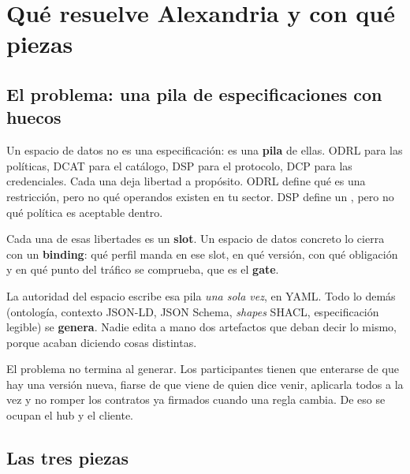 \chapter{Qué resuelve Alexandria y con qué piezas}
\label{ch:modelo}

\section{El problema: una pila de especificaciones con huecos}

Un espacio de datos no es una especificación: es una \textbf{pila} de ellas. ODRL para las políticas, DCAT para el
catálogo, DSP para el protocolo, DCP para las credenciales. Cada una deja libertad a propósito. ODRL define qué es
una restricción, pero no qué operandos existen en tu sector. DSP define un , pero no
qué política es aceptable dentro.

Cada una de esas libertades es un \textbf{slot}. Un espacio de datos concreto lo cierra con un \textbf{binding}:
qué perfil manda en ese slot, en qué versión, con qué obligación y en qué punto del tráfico se comprueba, que es
el \textbf{gate}.

\begin{ideaClave}
La autoridad del espacio escribe esa pila \emph{una sola vez}, en YAML. Todo lo demás (ontología, contexto JSON-LD,
JSON Schema, \emph{shapes} SHACL, especificación legible) se \textbf{genera}. Nadie edita a mano dos artefactos
que deban decir lo mismo, porque acaban diciendo cosas distintas.
\end{ideaClave}

El problema no termina al generar. Los participantes tienen que enterarse de que hay una versión nueva, fiarse de
que viene de quien dice venir, aplicarla todos a la vez y no romper los contratos ya firmados cuando una regla
cambia. De eso se ocupan el hub y el cliente.

\section{Las tres piezas}

